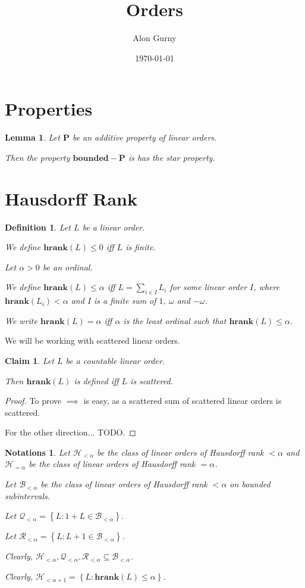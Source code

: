 \documentclass{article}
\author{Alon Gurny}
\title{Orders}
\date{\today}
\newtheorem{lemma}{Lemma}
\newtheorem{claim}{Claim}
\newtheorem{definition}{Definition}
\newtheorem{notations}{Notations}
\newcommand{\braces}[1]{\left\{ {#1} \right\}}
\newcommand{\setcomp}[1]{\braces{#1}}
\newcommand{\hrank}[1]{\mathbf{hrank}\left( #1 \right)}
\newcommand{\agemo}{-\omega}
\newcommand{\bounded}{\mathbf{bounded}}
\newcommand{\pp}{\mathbf{P}}
\begin{document}
\maketitle

\section{Properties}
\begin{lemma}
  Let $\pp$ be an additive property of linear orders.

  Then the property $\bounded-\pp$ is has the star property.
\end{lemma}

\section{Hausdorff Rank}

\begin{definition}
  Let $L$ be a linear order.

  We define $\hrank{L} \le 0$ iff $L$ is finite.

  Let $\alpha > 0$ be an ordinal.

  We define $\hrank{L} \le \alpha$
  iff $L = \sum_{i \in I} L_i$ for some linear order $I$,
  where $\hrank{L_i} < \alpha$ and $I$ is a finite sum of $1$, $\omega$ and
  $\agemo$.

  We write $\hrank{L} = \alpha$ iff $\alpha$ is the
  least ordinal such that $\hrank{L} \le \alpha$.
\end{definition}

We will be working with scattered linear orders.

\begin{claim}
  Let $L$ be a countable linear order.

  Then $\hrank{L}$ is defined iff $L$ is scattered.
\end{claim}

\begin{proof}
  To prove $\implies$ is easy, as a scattered sum of scattered linear orders is scattered.

  For the other direction... TODO.
\end{proof}

\begin{notations}
  Let $\mathcal{H}_{< \alpha}$ be the class of linear orders of Hausdorff rank
  $< \alpha$ and $\mathcal{H}_{=\alpha}$ be the class of linear orders of
  Hausdorff rank $= \alpha$.

  Let $\mathcal{B}_{< \alpha}$ be the class of linear orders
  of Hausdorff rank $< \alpha$ on bounded subintervals.

  Let $\mathcal{Q}_{< \alpha} = \setcomp{L : 1 + L \in \mathcal{B}_{< \alpha}}$.

  Let $\mathcal{R}_{< \alpha} = \setcomp{L : L + 1 \in \mathcal{B}_{< \alpha}}$.

  Clearly,
  $\mathcal{H}_{< \alpha}, \mathcal{Q}_{< \alpha}, \mathcal{R}_{< \alpha} \subseteq \mathcal{B}_{< \alpha}$.

  Clearly,
  $\mathcal{H}_{< \alpha + 1} = \setcomp{L : \hrank{L} \le \alpha}$.
\end{notations}
\end{document}
